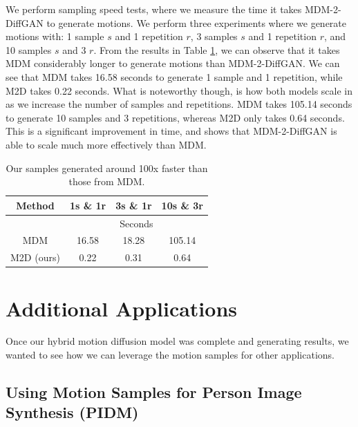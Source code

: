 \documentclass[10pt,twocolumn,letterpaper]{article}
\begin{document}
We perform sampling speed tests, where we measure the time it takes MDM-2-DiffGAN to generate motions. We perform 
three experiments where we generate motions with: 1 sample $s$ and 1 repetition $r$, 3 samples $s$ and 1 repetition $r$, and 10 samples 
$s$ and 3 $r$. From the results in Table \ref{tab:time}, we can observe that it takes MDM considerably longer to generate motions 
than MDM-2-DiffGAN. We can see that MDM takes 16.58 seconds to generate 1 sample and 1 repetition, while M2D takes 0.22 seconds. 
What is noteworthy though, is how both models scale in as we increase the number of samples and repetitions. MDM takes 105.14 seconds 
to generate 10 samples and 3 repetitions, whereas M2D only takes 0.64 seconds. This is a significant improvement in time, and shows that 
MDM-2-DiffGAN is able to scale much more effectively than MDM.
\begin{table}[]
    \centering
    \begin{tabular}{|c|ccc|}
    \hline
    Method & \multicolumn{1}{c|}{1s \& 1r} & \multicolumn{1}{c|}{3s \& 1r} & 10s \& 3r \\ \hline
           & \multicolumn{3}{c|}{Seconds}                                              \\ \hline
    MDM    & \multicolumn{1}{c|}{16.58}    & \multicolumn{1}{c|}{18.28}    & 105.14    \\ \hline
    M2D (ours)    & \multicolumn{1}{c|}{0.22}     & \multicolumn{1}{c|}{0.31}     & 0.64      \\ \hline
    \end{tabular}
    \caption{Our samples generated around 100x faster than those from MDM.}
    \label{tab:time}
\end{table}

\section{Additional Applications}
\label{sec:additional-applications}

Once our hybrid motion diffusion model was complete and generating results, we wanted to see how we can
leverage the motion samples for other applications. 

\subsection{Using Motion Samples for Person Image Synthesis (PIDM)}
\end{document}
